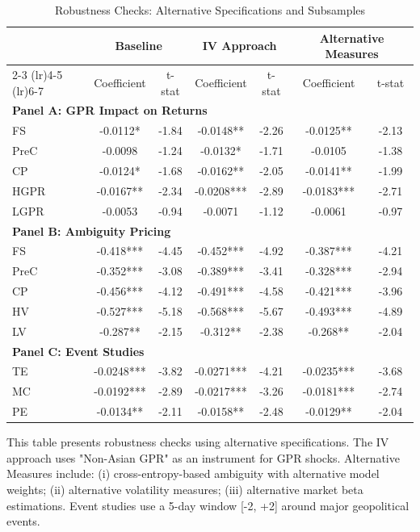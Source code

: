 \documentclass[preprint,12pt,authoryear]{elsarticle}
\begin{document}
\begin{table}[htbp]
\centering
\caption{Robustness Checks: Alternative Specifications and Subsamples}
\label{tab:robustness}
\begin{threeparttable}
\begin{tabular*}{\textwidth}{@{\extracolsep{\fill}} lcccccc @{\extracolsep{\fill}}}
\toprule
& \multicolumn{2}{c}{Baseline} & \multicolumn{2}{c}{IV Approach} & \multicolumn{2}{c}{Alternative Measures} \\
\cmidrule(lr){2-3} \cmidrule(lr){4-5} \cmidrule(lr){6-7}
& Coefficient & t-stat & Coefficient & t-stat & Coefficient & t-stat \\
\midrule
\midrule
\multicolumn{7}{l}{\textbf{Panel A: GPR Impact on Returns}} \\
FS & -0.0112* & -1.84 & -0.0148** & -2.26 & -0.0125** & -2.13 \\
PreC & -0.0098 & -1.24 & -0.0132* & -1.71 & -0.0105 & -1.38 \\
CP & -0.0124* & -1.68 & -0.0162** & -2.05 & -0.0141** & -1.99 \\
HGPR & -0.0167** & -2.34 & -0.0208*** & -2.89 & -0.0183*** & -2.71 \\
LGPR & -0.0053 & -0.94 & -0.0071 & -1.12 & -0.0061 & -0.97 \\
\midrule
\multicolumn{7}{l}{\textbf{Panel B: Ambiguity Pricing}} \\
FS & -0.418*** & -4.45 & -0.452*** & -4.92 & -0.387*** & -4.21 \\
PreC & -0.352*** & -3.08 & -0.389*** & -3.41 & -0.328*** & -2.94 \\
CP & -0.456*** & -4.12 & -0.491*** & -4.58 & -0.421*** & -3.96 \\
HV & -0.527*** & -5.18 & -0.568*** & -5.67 & -0.493*** & -4.89 \\
LV & -0.287** & -2.15 & -0.312** & -2.38 & -0.268** & -2.04 \\
\midrule
\multicolumn{7}{l}{\textbf{Panel C: Event Studies}} \\
TE & -0.0248*** & -3.82 & -0.0271*** & -4.21 & -0.0235*** & -3.68 \\
MC & -0.0192*** & -2.89 & -0.0217*** & -3.26 & -0.0181*** & -2.74 \\
PE & -0.0134** & -2.11 & -0.0158** & -2.48 & -0.0129** & -2.04 \\
\bottomrule
\end{tabular*}
\begin{tablenotes}[flushleft]
\small
\item[] This table presents robustness checks using alternative specifications. The IV approach uses "Non-Asian GPR" as an instrument for GPR shocks. Alternative Measures include: (i) cross-entropy-based ambiguity with alternative model weights; (ii) alternative volatility measures; (iii) alternative market beta estimations. Event studies use a 5-day window [-2, +2] around major geopolitical events.

\end{tablenotes}
\end{threeparttable}
\end{table}
\end{document}
